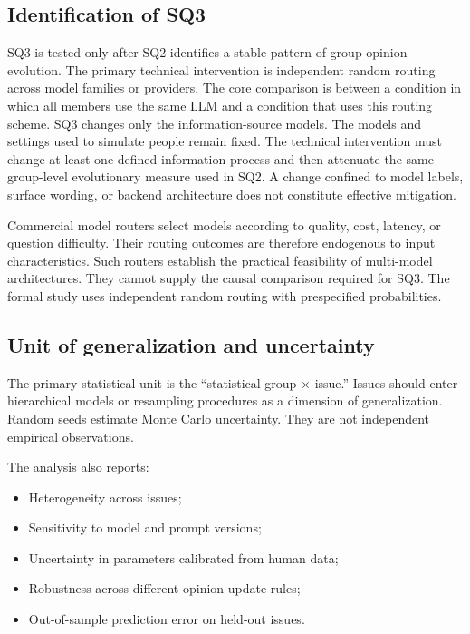 \documentclass[11pt,a4paper]{article}
\begin{document}
\subsection{Identification of SQ3}

SQ3 is tested only after SQ2 identifies a stable pattern of group opinion evolution. The primary technical intervention is independent random routing across model families or providers. The core comparison is between a condition in which all members use the same LLM and a condition that uses this routing scheme. SQ3 changes only the information-source models. The models and settings used to simulate people remain fixed. The technical intervention must change at least one defined information process and then attenuate the same group-level evolutionary measure used in SQ2. A change confined to model labels, surface wording, or backend architecture does not constitute effective mitigation.

Commercial model routers select models according to quality, cost, latency, or question difficulty. Their routing outcomes are therefore endogenous to input characteristics. Such routers establish the practical feasibility of multi-model architectures. They cannot supply the causal comparison required for SQ3. The formal study uses independent random routing with prespecified probabilities.

\subsection{Unit of generalization and uncertainty}

The primary statistical unit is the ``statistical group $\times$ issue.'' Issues should enter hierarchical models or resampling procedures as a dimension of generalization. Random seeds estimate Monte Carlo uncertainty. They are not independent empirical observations.

The analysis also reports:

\begin{itemize}
\item Heterogeneity across issues;
\item Sensitivity to model and prompt versions;
\item Uncertainty in parameters calibrated from human data;
\item Robustness across different opinion-update rules;
\item Out-of-sample prediction error on held-out issues.
\end{itemize}
\end{document}
